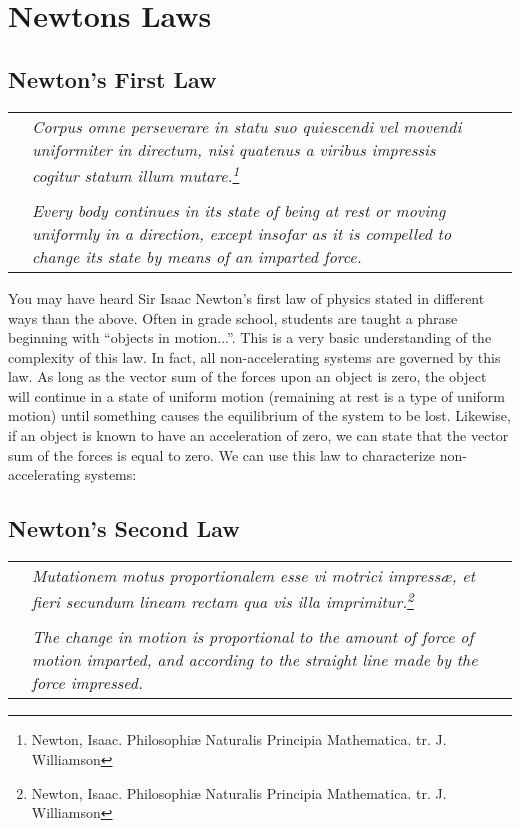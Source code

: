 \chapter{Newtons Laws}
	\section{Newton's First Law}
	\begin{tabular}{p{1in} p{4in} p{1in}}
		 & \textit{Corpus omne perseverare in statu suo quiescendi vel movendi uniformiter in directum, nisi quatenus a viribus impressis cogitur statum illum mutare.\footnote{Newton, Isaac.  Philosophiæ Naturalis Principia Mathematica.  tr. J. Williamson}} &  \\
		  & & \\
		 & \textit{Every body continues in its state of being at rest or moving uniformly in a direction, except insofar as it is compelled to change its state by means of an imparted force. } &
		 
	\end{tabular}
	

	
	You may have heard Sir Isaac Newton's first law of physics stated in different ways than the above.  Often in grade school, students are taught a phrase beginning with “objects in motion...”.  This is a very basic understanding of the complexity of this law.  In fact, all non-accelerating systems are governed by this law.  As long as the vector sum of the forces upon an object is zero, the object will continue in a state of uniform motion (remaining at rest is a type of uniform motion) until something causes the equilibrium of the system to be lost.  
	Likewise, if an object is known to have an acceleration of zero, we can state that the vector sum of the forces is equal to zero.  We can use this law to characterize non-accelerating systems:
	
	
	
	\section{Newton's Second Law}
		\begin{tabular}{p{1in} p{4in} p{1in}}
		& \textit{Mutationem motus proportionalem esse vi motrici impressæ, et fieri secundum lineam rectam qua vis illa imprimitur.\footnote{Newton, Isaac.  Philosophiæ Naturalis Principia Mathematica.  tr. J. Williamson}} &  \\
		& & \\
		& \textit{The change in motion is proportional to the amount of force of motion imparted, and according to the straight line made by the force impressed. } &
		
	\end{tabular}
	
